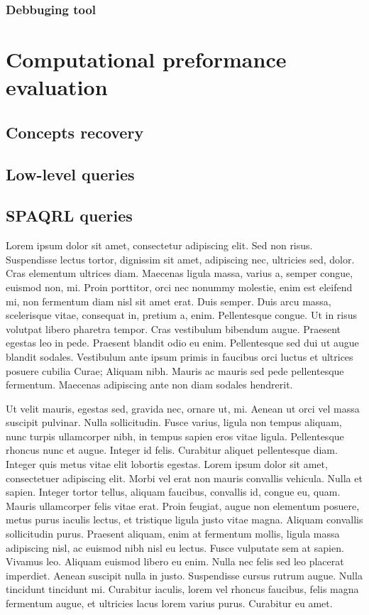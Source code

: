 \subsubsection{Debbuging tool}



\section{Computational preformance evaluation}

\subsection{Concepts recovery}

\subsection{Low-level queries}

\subsection{SPAQRL queries}

Lorem ipsum dolor sit amet, consectetur adipiscing elit. Sed non risus. Suspendisse lectus tortor, dignissim sit amet, adipiscing nec, ultricies sed, dolor. Cras elementum ultrices diam. Maecenas ligula massa, varius a, semper congue, euismod non, mi. Proin porttitor, orci nec nonummy molestie, enim est eleifend mi, non fermentum diam nisl sit amet erat. Duis semper. Duis arcu massa, scelerisque vitae, consequat in, pretium a, enim. Pellentesque congue. Ut in risus volutpat libero pharetra tempor. Cras vestibulum bibendum augue. Praesent egestas leo in pede. Praesent blandit odio eu enim. Pellentesque sed dui ut augue blandit sodales. Vestibulum ante ipsum primis in faucibus orci luctus et ultrices posuere cubilia Curae; Aliquam nibh. Mauris ac mauris sed pede pellentesque fermentum. Maecenas adipiscing ante non diam sodales hendrerit.

Ut velit mauris, egestas sed, gravida nec, ornare ut, mi. Aenean ut orci vel massa suscipit pulvinar. Nulla sollicitudin. Fusce varius, ligula non tempus aliquam, nunc turpis ullamcorper nibh, in tempus sapien eros vitae ligula. Pellentesque rhoncus nunc et augue. Integer id felis. Curabitur aliquet pellentesque diam. Integer quis metus vitae elit lobortis egestas. Lorem ipsum dolor sit amet, consectetuer adipiscing elit. Morbi vel erat non mauris convallis vehicula. Nulla et sapien. Integer tortor tellus, aliquam faucibus, convallis id, congue eu, quam. Mauris ullamcorper felis vitae erat. Proin feugiat, augue non elementum posuere, metus purus iaculis lectus, et tristique ligula justo vitae magna.
Aliquam convallis sollicitudin purus. Praesent aliquam, enim at fermentum mollis, ligula massa adipiscing nisl, ac euismod nibh nisl eu lectus. Fusce vulputate sem at sapien. Vivamus leo. Aliquam euismod libero eu enim. Nulla nec felis sed leo placerat imperdiet. Aenean suscipit nulla in justo. Suspendisse cursus rutrum augue. Nulla tincidunt tincidunt mi. Curabitur iaculis, lorem vel rhoncus faucibus, felis magna fermentum augue, et ultricies lacus lorem varius purus. Curabitur eu amet.

